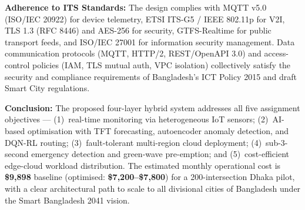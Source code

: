 \documentclass[11pt,a4paper]{article}
\begin{document}
\vspace{4pt}
\noindent\textbf{Adherence to ITS Standards:} The design complies with MQTT v5.0 (ISO/IEC 20922) for device telemetry, ETSI ITS-G5 / IEEE 802.11p for V2I, TLS 1.3 (RFC 8446) and AES-256 for security, GTFS-Realtime for public transport feeds, and ISO/IEC 27001 for information security management. Data communication protocols (MQTT, HTTP/2, REST/OpenAPI 3.0) and access-control policies (IAM, TLS mutual auth, VPC isolation) collectively satisfy the security and compliance requirements of Bangladesh's ICT Policy 2015 and draft Smart City regulations.

\vspace{4pt}
\noindent\textbf{Conclusion:} The proposed four-layer hybrid system addresses all five assignment objectives — (1)~real-time monitoring via heterogeneous IoT sensors; (2)~AI-based optimisation with TFT forecasting, autoencoder anomaly detection, and DQN-RL routing; (3)~fault-tolerant multi-region cloud deployment; (4)~sub-3-second emergency detection and green-wave pre-emption; and (5)~cost-efficient edge-cloud workload distribution. The estimated monthly operational cost is \textbf{\$9,898} baseline (optimised: \textbf{\$7,200--\$7,800}) for a 200-intersection Dhaka pilot, with a clear architectural path to scale to all divisional cities of Bangladesh under the Smart Bangladesh 2041 vision.
\end{document}
